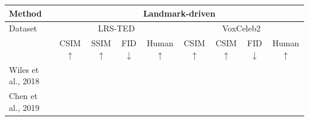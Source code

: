 \documentclass[runningheads]{llncs}
\begin{document}
\begin{table}[t]
    \centering
    \scriptsize
    \begin{tabular*}{0.98\linewidth}{  l | c c  c c| c c c c }
      \toprule
      \toprule
 Method & \multicolumn{8}{c}{Landmark-driven}   \\ \hline
Dataset & \multicolumn{4}{c}{LRS-TED} & \multicolumn{4}{c}{VoxCeleb2}  \\
      \midrule
&{{\scriptsize{CSIM}}$\uparrow$}& {{\scriptsize{SSIM}}$\uparrow$} & 
{{\scriptsize{FID}}$\downarrow$} & {{\scriptsize{Human}}$\uparrow$} &{{\scriptsize{CSIM}}$\uparrow$}  %
& {{\scriptsize{CSIM}}$\uparrow$}&{{\scriptsize{FID}}$\downarrow$} & {{\scriptsize{Human}}$\uparrow$}   \\
{{\scriptsize{Wiles et al., 2018}~\cite{wiles2018x2face}}} &  &      &  &    &   &  \\ %

{{\scriptsize{Chen et al., 2019}~\cite{chen2019hierarchical}}}&  &  & \textbf{  } &   &       &   \\   %


\end{tabular*}
\end{table}
\end{document}
